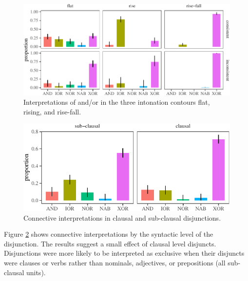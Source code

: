 \documentclass[,man,floatsintext]{apa6}
\begin{document}
\begin{figure}[tb]

{\centering \includegraphics{figs/consistencyByintonationPlot-1} 

}

\caption{Interpretations of and/or in the three intonation contours flat, rising, and rise-fall.}\label{fig:consistencyByintonationPlot}
\end{figure}

\begin{figure}[tb]

{\centering \includegraphics{figs/syntaxPlot-1} 

}

\caption{Connective interpretations in clausal and sub-clausal disjunctions.}\label{fig:syntaxPlot}
\end{figure}

Figure \ref{fig:syntaxPlot} shows connective interpretations by the syntactic level of the disjunction. The results suggest a small effect of clausal level disjuncts. Disjunctions were more likely to be interpreted as exclusive when their disjuncts were clauses or verbs rather than nominals, adjectives, or prepositions (all sub-clausal units).
\end{document}

